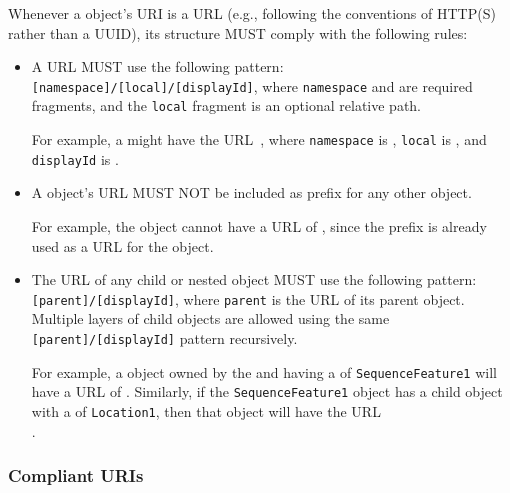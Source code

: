 Whenever a  object's URI is a URL (e.g., following the conventions of HTTP(S) rather than a UUID), its structure MUST comply with the following rules:

\begin{itemize}

 \item A  URL MUST use the following pattern:
  \texttt{[namespace]/[local]/[displayId]},  where \texttt{namespace} and  are required fragments, and the \texttt{local} fragment is an optional relative path.
  
  	For example, a  might have the URL~, where \texttt{namespace} is , \texttt{local} is , and \texttt{displayId} is .

  \item A  object's URL MUST NOT be included as prefix for any other  object.
  
  	For example, the   object cannot have a URL of , since the  prefix is already used as a URL for the   object.

  \item The URL of any child or nested object MUST use the following pattern:\texttt{[parent]/[displayId]}, where \texttt{parent} is the URL of its parent object.
	Multiple layers of child objects are allowed using the same\\ \texttt{[parent]/[displayId]} pattern recursively.
	
	For example, a  object owned by the   and having a  of \texttt{SequenceFeature1} will have a URL of .
	Similarly, if the \texttt{SequenceFeature1} object has a  child object with a  of \texttt{Location1}, then that object will have the URL\\ .
  \end{itemize}

\subsubsection{Compliant URIs}
\label{sec:compliant}

